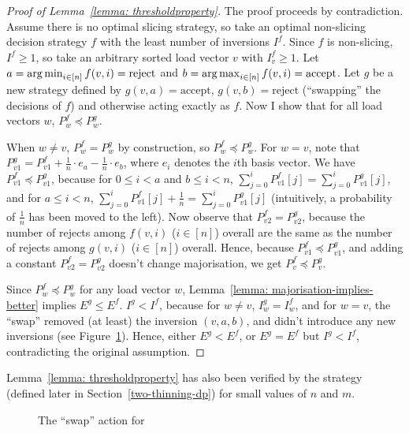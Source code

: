\begin{proof} [Proof of Lemma~\ref{lemma: thresholdproperty}]
    The proof proceeds by contradiction. Assume there is no optimal slicing strategy, so take an optimal non-slicing decision strategy $f$ with the least number of inversions $I^f$. Since $f$ is non-slicing, $I^f\geq 1$, so take an arbitrary sorted load vector $v$ with $I^f_v\geq 1$. Let $a=\operatorname*{arg\,min}_{i\in [n]} f(v,i)=\mathrm{reject}$ and $b=\operatorname*{arg\,max}_{i\in [n]} f(v,i)=\mathrm{accept}$. Let $g$ be a new strategy defined by $g(v,a)=\mathrm{accept}$, $g(v,b)=\mathrm{reject}$ (``swapping'' the decisions of $f$) and otherwise acting exactly as $f$. Now I show that for all load vectors $w$, $P^f_w\preccurlyeq P^g_w$.
    
    When $w\neq v$, $P^f_w = P^g_w$ by construction, so $P^f_w\preccurlyeq P^g_w$. For $w=v$, note that $P^g_{v1}=P^f_{v1}+\frac{1}{n}\cdot e_a-\frac{1}{n}\cdot e_b$, where $e_i$ denotes the $i$th basis vector. We have $P^f_{v1}\preccurlyeq P^g_{v1}$, because for $0\leq i<a$ and $b\leq i<n$, $\sum_{j=0}^i P^f_{v1}[j] = \sum_{j=0}^i P^g_{v1}[j]$, and for $a\leq i<n$, $\sum_{j=0}^i P^f_{v1}[j] + \frac{1}{n} = \sum_{j=0}^i P^g_{v1}[j]$ (intuitively, a probability of $\frac{1}{n}$ has been moved to the left). Now observe that $P^f_{v2}=P^g_{v2}$, because the number of rejects among $f(v,i)$ ($i\in [n]$) overall are the same as the number of rejects among $g(v,i)$ ($i\in [n]$) overall. Hence, because $P^f_{v1}\preccurlyeq P^g_{v1}$, and adding a constant $P^f_{v2}=P^g_{v2}$ doesn't change majorisation, we get $P^f_v \preccurlyeq P^g_v$.
    
    
    Since $P^f_w\preccurlyeq P^g_w$ for any load vector $w$, Lemma~\ref{lemma: majorisation-implies-better} implies $E^g\leq E^f$. $I^g<I^f$, because for $w\neq v$, $I^g_w=I^f_w$, and for $w=v$, the ``swap'' removed (at least) the inversion $(v,a,b)$, and didn't introduce any new inversions (see Figure~\ref{two-thinning-swap-action}). Hence, either $E^g<E^f$, or $E^g=E^f$ but $I^g<I^f$, contradicting the original assumption.
\end{proof}


\begin{remark}
Lemma~\ref{lemma: thresholdproperty} has also been verified by the \DP strategy (defined later in Section~\ref{two-thinning-dp}) for small values of $n$ and $m$.
\end{remark}



\begin{figure}
    \centering
    \caption{The ``swap'' action for \TwoThinning}
    \label{two-thinning-swap-action}
\end{figure}


